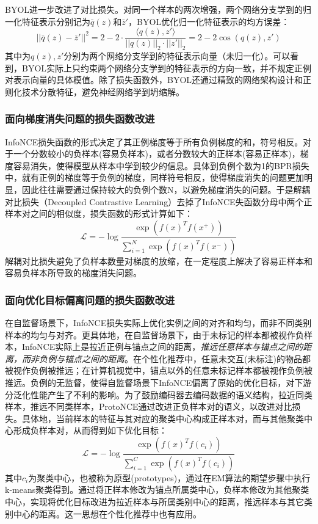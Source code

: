 BYOL\cite{BYOL:2020:NIPS}进一步改进了对比损失。对同一个样本的两次增强，两个网络分支学到的归一化特征表示分别记为$\bar q(z)$和$\bar z\prime $，BYOL优化归一化特征表示的均方误差：
\[||\bar q(z)-\bar z\prime||^2 =2-2\cdot \frac{\langle q(z),z\prime \rangle}{||q(z)||_2\cdot||z\prime||_2  } = 2-2\cos(q(z),z\prime)\]
其中为$q(z),z\prime$分别为两个网络分支学到的特征表示向量（未归一化）。可以看到，BYOL实际上只约束两个网络分支学到的特征表示的方向一致，并不规定正例对表示向量的具体模值。除了损失函数外，BYOL还通过精致的网络架构设计和正则化技术分散特征，避免神经网络学到坍缩解。

\subsubsection{面向梯度消失问题的损失函数改进}
InfoNCE损失函数的形式决定了其正例梯度等于所有负例梯度的和，符号相反\cite{Feng:2021:CVPR}。对于一个分数较小的负样本(容易负样本)，或者分数较大的正样本(容易正样本)，梯度容易消失，使得模型从样本中学到较少的信息。具体到负例个数为1的BPR损失中，就有正例的梯度等于负例的梯度，同样符号相反，使得梯度消失的问题更加明显，因此往往需要通过保持较大的负例个数N，以避免梯度消失的问题\cite{He:2020:CVPR}。于是解耦对比损失\cite{yeh:2022:ECCV}（Decoupled Contrastive Learning）去掉了InfoNCE失函数分母中两个正样本对之间的相似度，损失函数的形式计算如下：
\[
\mathcal{L} = -\log \frac{\exp(f(x)^Tf(x^+))}{\sum_{i=1}^{N}\exp(f(x)^Tf(x^-))}
\]
解耦对比损失避免了负样本数量对梯度的放缩，在一定程度上解决了容易正样本和容易负样本所导致的梯度消失问题。


\subsubsection{面向优化目标偏离问题的损失函数改进}
在自监督场景下，InfoNCE损失实际上优化实例之间的对齐和均匀，而非不同类别样本的均匀与对齐。更具体地，在自监督场景下，由于未标记的样本都被视作负样本，InfoNCE实际上是拉近正例与锚点之间的距离，\textit{推远任意样本与锚点之间的距离，而非负例与锚点之间的距离}。在个性化推荐中，任意未交互(未标注)的物品都被视作负例被推远；在计算机视觉中，锚点以外的任意未标记样本都被视作负例被推远。负例的无监督，使得自监督场景下InfoNCE偏离了原始的优化目标，对下游分泛化性能产生了不利的影响。为了鼓励编码器去编码数据的语义结构，拉近同类样本，推远不同类样本，ProtoNCE\cite{Li:2021:ICLR}通过改进正负样本对的语义，以改进对比损失。具体地，当前样本的特征与其对应的聚类中心构成正样本对，而与其他聚类中心形成负样本对，从而得到如下优化目标：
\[
\mathcal{L} = -\log \frac{\exp(f(x)^Tf(c_i))}{\sum_{i=1}^{C}\exp(f(x)^Tf(c_i))}
\]
其中$c_i$为聚类中心，也被称为原型(prototypes)，通过在EM算法的期望步骤中执行k-means聚类得到。通过将正样本修改为锚点所属类中心，负样本修改为其他聚类中心，实现将优化目标改进为拉近样本与所属类别中心的距离，推远样本与其它类别中心的距离。这一思想在个性化推荐中也有应用\cite{lin2022improving}。

